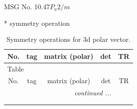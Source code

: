 \documentclass[fleqn,8pt]{jsarticle}
\begin{document}
\setcounter{MaxMatrixCols}{32}

\renewcommand{\tablename}{Table~}
\renewcommand{\figurename}{Figure~}
\begin{center}
\LARGE
MSG No. 10.47\quad$P_{a}2/m$
\end{center}
* symmetry operation
\renewcommand{\arraystretch}{1.3}
\begin{longtable}{ccccc}
\caption{Symmetry operations for 3d polar vector.}
 \\
 \hline \hline
No. & tag & matrix (polar) & det & TR \\ \hline \endfirsthead

\multicolumn{4}{l}{\tablename\ \thetable{}} \\
 \hline \hline
No. & tag & matrix (polar) & det & TR \\ \hline \endhead

 \hline \hline
\multicolumn{4}{r}{\footnotesize\it continued ...} \\ \endfoot

 \hline \hline
\multicolumn{4}{r}{} \\ \endlastfoot


\end{longtable}
\end{document}
